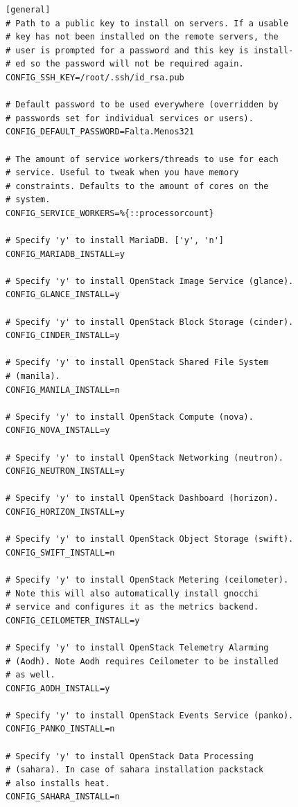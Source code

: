 \documentclass[12pt,a4paper,oneside]{book}
\begin{document}
\vspace{0.5cm}
\begin{lstlisting}[style=codigobase,  caption= answers.cfg]
[general]
# Path to a public key to install on servers. If a usable
# key has not been installed on the remote servers, the 
# user is prompted for a password and this key is install-
# ed so the password will not be required again.
CONFIG_SSH_KEY=/root/.ssh/id_rsa.pub

# Default password to be used everywhere (overridden by 
# passwords set for individual services or users).
CONFIG_DEFAULT_PASSWORD=Falta.Menos321

# The amount of service workers/threads to use for each 
# service. Useful to tweak when you have memory 
# constraints. Defaults to the amount of cores on the 
# system.
CONFIG_SERVICE_WORKERS=%{::processorcount}

# Specify 'y' to install MariaDB. ['y', 'n']
CONFIG_MARIADB_INSTALL=y

# Specify 'y' to install OpenStack Image Service (glance).
CONFIG_GLANCE_INSTALL=y

# Specify 'y' to install OpenStack Block Storage (cinder).
CONFIG_CINDER_INSTALL=y

# Specify 'y' to install OpenStack Shared File System 
# (manila).
CONFIG_MANILA_INSTALL=n

# Specify 'y' to install OpenStack Compute (nova).
CONFIG_NOVA_INSTALL=y

# Specify 'y' to install OpenStack Networking (neutron).
CONFIG_NEUTRON_INSTALL=y

# Specify 'y' to install OpenStack Dashboard (horizon).
CONFIG_HORIZON_INSTALL=y

# Specify 'y' to install OpenStack Object Storage (swift).
CONFIG_SWIFT_INSTALL=n

# Specify 'y' to install OpenStack Metering (ceilometer). 
# Note this will also automatically install gnocchi 
# service and configures it as the metrics backend.
CONFIG_CEILOMETER_INSTALL=y

# Specify 'y' to install OpenStack Telemetry Alarming 
# (Aodh). Note Aodh requires Ceilometer to be installed 
# as well.
CONFIG_AODH_INSTALL=y

# Specify 'y' to install OpenStack Events Service (panko).
CONFIG_PANKO_INSTALL=n

# Specify 'y' to install OpenStack Data Processing 
# (sahara). In case of sahara installation packstack 
# also installs heat.
CONFIG_SAHARA_INSTALL=n


\end{lstlisting}
\end{document}
